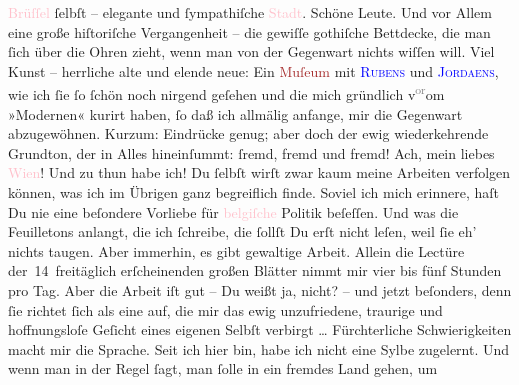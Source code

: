                   \textcolor{pink}{Brüſſel}{}\ledrightnote{\textcolor{pink}{Brüssel}} ſelbſt – elegante und ſympathiſche \textcolor{pink}{Stadt}{}. Schöne Leute. Und vor
               Allem eine große hiſtoriſche Vergangenheit – die gewiſſe gothiſche Bettdecke, die man
               ſich über die  Ohren zieht, wenn man von der
               Gegenwart nichts wiſſen will. {\pb}Viel Kunst –
               herrliche alte und elende neue: Ein \textcolor{brown}{Muſeum}{} mit \textsc{\textcolor{blue}{Rubens}{}\ledrightnote{\textcolor{blue}{Peter Paul Rubens}}} und \textsc{\textcolor{blue}{Jordaens}{}\ledrightnote{\textcolor{blue}{Jacob Jordaens}}}, wie ich ſie ſo ſchön noch nirgend geſehen und die mich gründlich v\substVorne{}\textsuperscript{\textcolor{gray}{or}}\substDazwischen{}om\substHinten{} »Modernen« kurirt haben, ſo daß ich allmälig anfange, mir die Gegenwart
               abzugewöhnen. Kurzum: Eindrücke genug; aber doch der ewig wiederkehrende Grundton,
               der in Alles hineinſummt: ſremd, fremd und fremd! Ach, mein liebes \textcolor{pink}{Wien}{}\ledrightnote{\textcolor{pink}{Wien}}! {\dotsfive}\pend
           \pstart
           Und zu thun habe ich! Du ſelbſt wirſt zwar kaum meine Arbeiten verfolgen können, was
               ich im Übrigen ganz begreiflich finde. Soviel ich mich erinnere, haſt Du nie eine
               beſondere Vorliebe für \textcolor{pink}{belgiſche}{}\ledrightnote{\textcolor{pink}{Belgien}} Politik
               beſeſſen. Und was die Feuilletons anlangt, die ich ſchreibe, die ſollſt Du erſt nicht
               leſen, weil ſie eh’ nichts taugen. Aber immerhin, es gibt gewaltige Arbeit. Allein
               die Lectüre der 14 freitäglich erſcheinenden großen Blätter nimmt mir vier bis fünf
               Stunden pro Tag. Aber die Arbeit iſt gut – Du weißt ja, nicht? – und jetzt beſonders,
               denn ſie richtet ſich als eine \label{K_L02664-8v}\label{K_L02664-8h} auf, die mir das {\pb}ewig unzufriedene, traurige und hoffnungsloſe
               Geſicht eines eigenen Selbſt verbirgt {\dots} Fürchterliche
               Schwierigkeiten macht mir die Sprache. Seit ich hier bin, habe ich nicht eine Sylbe
               zugelernt. Und wenn man in der Regel ſagt, man ſolle in ein fremdes Land gehen, um
